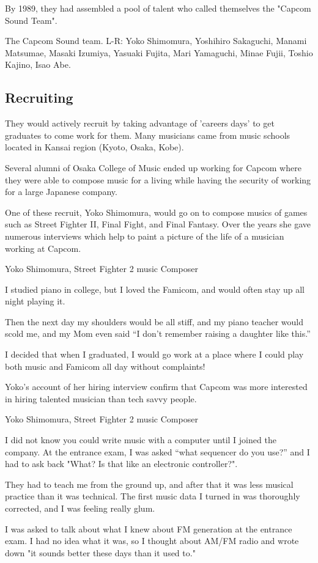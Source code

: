 By 1989, they had assembled a pool of talent who called themselves the "Capcom Sound Team".


The Capcom Sound team. L-R: Yoko Shimomura, Yoshihiro Sakaguchi, Manami Matsumae, Masaki Izumiya, Yasuaki Fujita, Mari Yamaguchi, Minae Fujii, Toshio Kajino, Isao Abe.

\subsection{Recruiting}
They would actively recruit by taking advantage of 'careers days' to get graduates to come work for them. Many musicians came from music schools located in Kansai region (Kyoto, Osaka, Kobe). 

Several alumni of Osaka College of Music ended up working for Capcom where they were able to compose music for a living while having the security of working for a large Japanese company. 





One of these recruit, Yoko Shimomura, would go on to compose musics of games such as Street Fighter II, Final Fight, and Final Fantasy. Over the years she gave numerous interviews which help to paint a picture of the life of a musician working at Capcom.


\begin{q}{Yoko Shimomura, Street Fighter 2 music Composer\cite{beep199010}}

I studied piano in college, but I loved the Famicom, and would often stay up all night playing it. 

Then the next day my shoulders would be all stiff, and my piano teacher would scold me, and my Mom even said “I don’t remember raising a daughter like this.”

I decided that when I graduated, I would go work at a place where I could play both music and Famicom all day without complaints!
\end{q}


Yoko's account of her hiring interview confirm that Capcom was more interested in hiring talented musician than tech savvy people.

\begin{q}{Yoko Shimomura, Street Fighter 2 music Composer\cite{beep199010}}
  
I did not know you could write music with a computer until I joined the company. At the entrance exam, I was asked “what sequencer do you use?” and I had to ask back "What? Is that like an electronic controller?".

They had to teach me from the ground up, and after that it was less musical practice than it was technical. The first music data I turned in was thoroughly corrected, and I was feeling really glum.

I was asked to talk about what I knew about FM generation at the entrance exam. I had no idea what it was, so I thought about AM/FM radio and wrote down "it sounds better these days than it used to."
\end{q}



